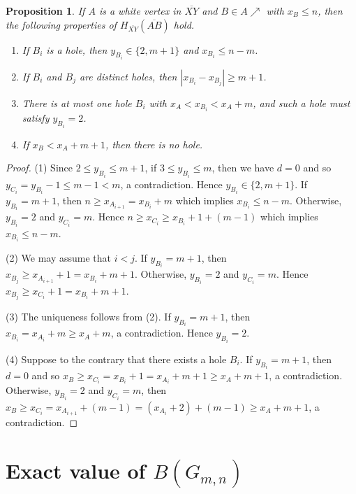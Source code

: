 \documentclass[preprint,12pt]{elsarticle}
\newtheorem{proposition}[theorem]{Proposition}
\def\NEarrow#1{#1{\nearrow}}
\begin{document}
{%
\begin{proposition}\label{prop7}
If $A$ is a white vertex in $\overline{XY}$ and $B\in\NEarrow{A}$ with $x_B\le n$,
then the following properties of $H_{\overline{XY}}(\overline{AB})$ hold.
\begin{enumerate}
\item[(1)]
If $B_i$ is a hole, then $y_{B_i}\in\{2,m+1\}$ and $x_{B_i}\le n-m$.

\item[(2)]
If $B_i$ and $B_j$ are distinct holes, then $|x_{B_i}-x_{B_j}|\ge m+1$.

\item[(3)]
There is at most one hole $B_i$ with $x_A<x_{B_i}<x_A+m$,
and such a hole must satisfy $y_{B_i}=2$.

\item[(4)]
If $x_B<x_A+m+1$, then there is no hole.
\end{enumerate}
\end{proposition}
\begin{proof}
(1)
Since $2\le y_{B_i}\le m+1$,
if $3\le  y_{B_i}\le m$, then we have $d=0$ and so $y_{C_i}=y_{B_i}-1\le m-1<m$,
a contradiction.
Hence $y_{B_i}\in\{2,m+1\}$.
If $y_{B_i}=m+1$, then $n\ge x_{A_{i+1}}=x_{B_i}+m$ which implies $x_{B_i}\le n-m$.
Otherwise, $y_{B_i}=2$ and $y_{C_i}=m$.
Hence $n\ge x_{C_i}\ge x_{B_i}+1+(m-1)$ which implies $x_{B_i}\le n-m$.

(2)
We may assume that $i<j$.
If $y_{B_i}=m+1$, then $x_{B_j}\ge x_{A_{i+1}}+1=x_{B_i}+m+1$.
Otherwise, $y_{B_i}=2$ and $y_{C_i}=m$.
Hence $x_{B_j}\ge x_{C_i}+1=x_{B_i}+m+1$.

(3)
The uniqueness follows from (2).
If $y_{B_i}=m+1$, then $x_{B_i}=x_{A_i}+m\ge x_A+m$, a contradiction.
Hence $y_{B_i}=2$.

(4)
Suppose to the contrary that there exists a hole $B_i$.
If $y_{B_i}=m+1$, then $d=0$ and
so $x_B\ge x_{C_i}=x_{B_i}+1=x_{A_i}+m+1\ge x_A+m+1$,
a contradiction.
Otherwise, $y_{B_i}=2$ and $y_{C_i}=m$,
then $x_B\ge x_{C_i}
= x_{A_{i+1}}+(m-1)= (x_{A_i}+2)+(m-1)\ge x_A+m+1$, a contradiction.
\end{proof}

\section{Exact value of $B(G_{m,n})$}\label{sec2}

}
\end{document}
